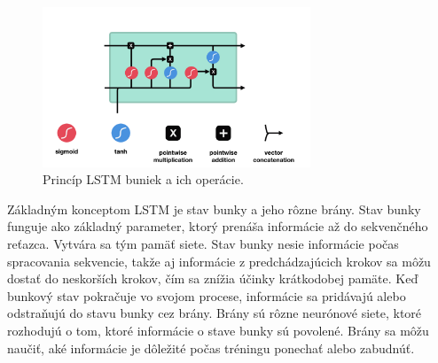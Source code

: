 \begin{figure}[!htbp]
  \centering
  \includegraphics[width=8cm]{img/lstm.png}
  \caption{Princíp LSTM buniek a ich operácie.}
  \label{lstm}
\end{figure}

Základným konceptom LSTM je stav bunky a jeho rôzne brány. Stav bunky funguje ako základný parameter, ktorý prenáša informácie až do sekvenčného reťazca. Vytvára sa tým pamäť siete. Stav bunky nesie informácie počas spracovania sekvencie, takže aj informácie z predchádzajúcich krokov sa môžu dostať do neskorších krokov, čím sa znížia účinky krátkodobej pamäte. Keď bunkový stav pokračuje vo svojom procese, informácie sa pridávajú alebo odstraňujú do stavu bunky cez brány. Brány sú rôzne neurónové siete, ktoré rozhodujú o tom, ktoré informácie o stave bunky sú povolené. Brány sa môžu naučiť, aké informácie je dôležité počas tréningu ponechať alebo zabudnúť.


